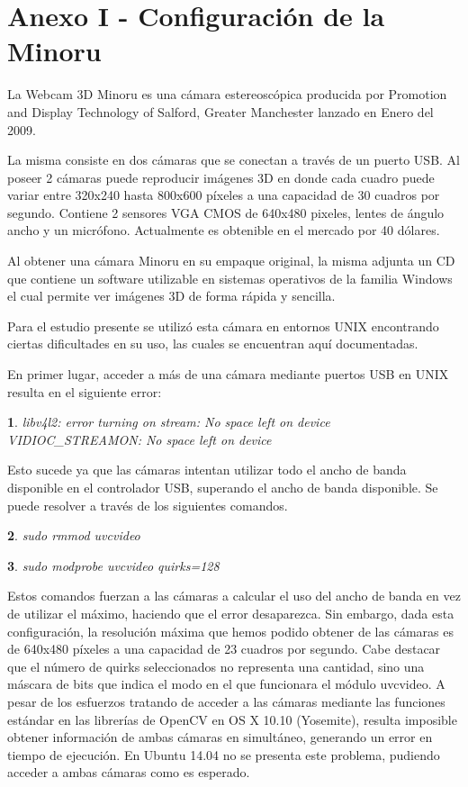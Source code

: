\documentclass[11pt,a4paper,titlepage]{article}
\newtheorem{mytheorem}{}
\newenvironment{theorem}%
  {\begin{lrbox}{\thmbox}%
   \begin{minipage}{\dimexpr\linewidth-2\fboxsep}
   \begin{mytheorem}}%
  {\end{mytheorem}%
   \end{minipage}%
   \end{lrbox}%
   \begin{trivlist}
     \item[]\colorbox{lightgray}{\usebox\thmbox}
   \end{trivlist}}
\begin{document}
\newpage

\section{Anexo I - Configuración de la Minoru}

La Webcam 3D Minoru es una cámara estereoscópica producida por Promotion and Display Technology of Salford, Greater Manchester lanzado en Enero del 2009.

La misma consiste en dos cámaras que se conectan a través de un puerto USB. Al poseer 2 cámaras puede reproducir imágenes 3D en donde cada cuadro puede variar entre 320x240 hasta 800x600 píxeles a una capacidad de 30 cuadros por segundo. Contiene 2 sensores VGA CMOS de 640x480 pixeles, lentes de ángulo ancho y un micrófono. Actualmente es obtenible en el mercado por 40 dólares.

Al obtener una cámara Minoru en su empaque original, la misma adjunta un CD que contiene un software utilizable en sistemas operativos de la familia Windows el cual permite ver imágenes 3D de forma rápida y sencilla.

Para el estudio presente se utilizó esta cámara en entornos UNIX encontrando ciertas dificultades en su uso, las cuales se encuentran aquí documentadas.

En primer lugar, acceder a más de una cámara mediante puertos USB en UNIX resulta en el siguiente error:

\begin{theorem}
libv4l2: error turning on stream: No space left on device VIDIOC\_STREAMON: No space left on device
\end{theorem}

Esto sucede ya que las cámaras intentan utilizar todo el ancho de banda disponible en el controlador USB, superando el ancho de banda disponible. Se puede resolver a través de los siguientes comandos.

\begin{theorem}
sudo rmmod uvcvideo
\end{theorem}

\begin{theorem}
sudo modprobe uvcvideo quirks=128
\end{theorem}

Estos comandos fuerzan a las cámaras a calcular el uso del ancho de banda en vez de utilizar el máximo, haciendo que el error desaparezca. Sin embargo, dada esta configuración, la resolución máxima que hemos podido obtener de las cámaras es de 640x480 píxeles a una capacidad de 23 cuadros por segundo. Cabe destacar que el número de quirks seleccionados no representa una cantidad, sino una máscara de bits que indica el modo en el que funcionara el módulo uvcvideo.
A pesar de los esfuerzos tratando de acceder a las cámaras mediante las funciones estándar en las librerías de OpenCV en OS X 10.10 (Yosemite), resulta imposible obtener información de ambas cámaras en simultáneo, generando un error en tiempo de ejecución. En Ubuntu 14.04 no se presenta este problema, pudiendo acceder a ambas cámaras como es esperado.
\end{document}
